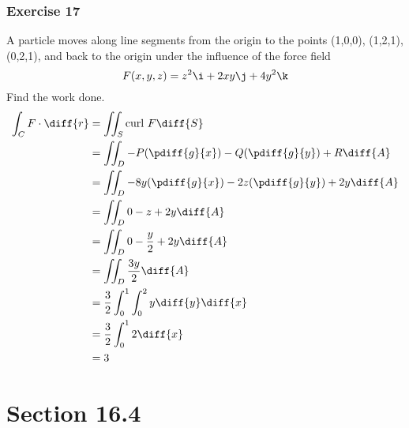 \documentclass{math}
\begin{document}
\subsubsection*{Exercise 17}
A particle moves along line segments from the origin to the points (1,0,0),
(1,2,1), (0,2,1), and back to the origin under the influence of the force field
\[ F(x,y,z) = z^2\i+2xy\j+4y^2\k \]
Find the work done.
\begin{align*}
  \int_{C}F\cdot\diff{r} &= \iint_{S}\text{curl}~F\diff{S} \\
  &= \iint_{D}-P(\pdiff{g}{x})-Q(\pdiff{g}{y})+R\diff{A} \\
  &= \iint_{D}-8y(\pdiff{g}{x})-2z(\pdiff{g}{y})+2y\diff{A} \\
  &= \iint_{D}0-z+2y\diff{A} \\
  &= \iint_{D}0-\frac{y}{2}+2y\diff{A} \\
  &= \iint_{D}\frac{3y}{2}\diff{A} \\
  &= \frac{3}{2}\int_{0}^{1}\int_{0}^{2}y\diff{y}\diff{x} \\
  &= \frac{3}{2}\int_{0}^{1}2\diff{x} \\
  &= 3
\end{align*}

\section*{Section 16.4}
\end{document}
